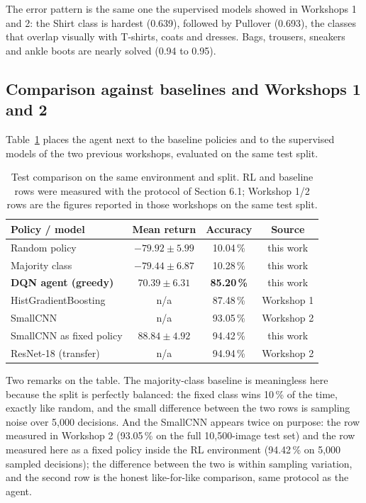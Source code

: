 \documentclass[11pt,a4paper]{article}
\begin{document}
The error pattern is the same one the supervised models showed in Workshops 1 and 2: the Shirt class is hardest (0.639), followed by Pullover (0.693), the classes that overlap visually with T-shirts, coats and dresses. Bags, trousers, sneakers and ankle boots are nearly solved (0.94 to 0.95).

\subsection{Comparison against baselines and Workshops 1 and 2}

Table~\ref{tab:comp} places the agent next to the baseline policies and to the supervised models of the two previous workshops, evaluated on the same test split.

\begin{table}[h]
\centering
\caption{Test comparison on the same environment and split. RL and baseline rows were measured with the protocol of Section 6.1; Workshop 1/2 rows are the figures reported in those workshops on the same test split.}
\label{tab:comp}
\begin{tabular}{lccc}
\toprule
Policy / model & Mean return & Accuracy & Source \\
\midrule
Random policy & $-79.92 \pm 5.99$ & 10.04\,\% & this work \\
Majority class & $-79.44 \pm 6.87$ & 10.28\,\% & this work \\
\textbf{DQN agent (greedy)} & $\mathbf{70.39 \pm 6.31}$ & \textbf{85.20\,\%} & this work \\
\midrule
HistGradientBoosting & n/a & 87.48\,\% & Workshop 1 \\
SmallCNN & n/a & 93.05\,\% & Workshop 2 \\
SmallCNN as fixed policy & $88.84 \pm 4.92$ & 94.42\,\% & this work \\
ResNet-18 (transfer) & n/a & 94.94\,\% & Workshop 2 \\
\bottomrule
\end{tabular}
\end{table}

Two remarks on the table. The majority-class baseline is meaningless here because the split is perfectly balanced: the fixed class wins 10\,\% of the time, exactly like random, and the small difference between the two rows is sampling noise over 5{,}000 decisions. And the SmallCNN appears twice on purpose: the row measured in Workshop 2 (93.05\,\% on the full 10{,}500-image test set) and the row measured here as a fixed policy inside the RL environment (94.42\,\% on 5{,}000 sampled decisions); the difference between the two is within sampling variation, and the second row is the honest like-for-like comparison, same protocol as the agent.
\end{document}
